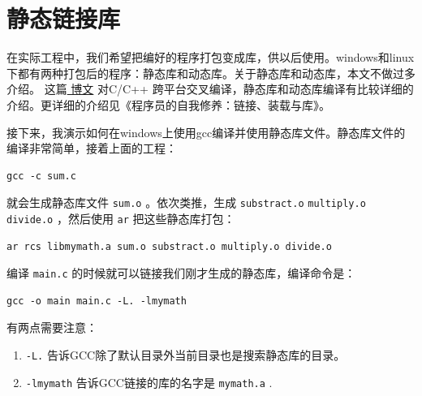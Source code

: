 \documentclass[10pt,a4paper,UTF8]{article}
\begin{document}
\section{静态链接库}
\label{sec:org85e420d}


在实际工程中，我们希望把编好的程序打包变成库，供以后使用。windows和linux下都有两种打包后的程序：静态库和动态库。关于静态库和动态库，本文不做过多介绍。 这篇\href{http://www.cnblogs.com/LittleHann/p/3980364.html}{ 博文} 对C/C++ 跨平台交叉编译，静态库和动态库编译有比较详细的介绍。更详细的介绍见《程序员的自我修养：链接、装载与库》。

接下来，我演示如何在windows上使用gcc编译并使用静态库文件。静态库文件的编译非常简单，接着上面的工程：
\begin{verbatim}
gcc -c sum.c
\end{verbatim}
就会生成静态库文件 \texttt{sum.o} 。依次类推，生成 \texttt{substract.o} \texttt{multiply.o} \texttt{divide.o} ，然后使用 \texttt{ar} 把这些静态库打包：
\begin{verbatim}
ar rcs libmymath.a sum.o substract.o multiply.o divide.o
\end{verbatim}

编译 \texttt{main.c} 的时候就可以链接我们刚才生成的静态库，编译命令是：
\begin{verbatim}
gcc -o main main.c -L. -lmymath
\end{verbatim}

有两点需要注意：
\begin{enumerate}
\item \texttt{-L.} 告诉GCC除了默认目录外当前目录也是搜索静态库的目录。
\item \texttt{-lmymath} 告诉GCC链接的库的名字是 \texttt{mymath.a} .
\end{enumerate}
\end{document}
